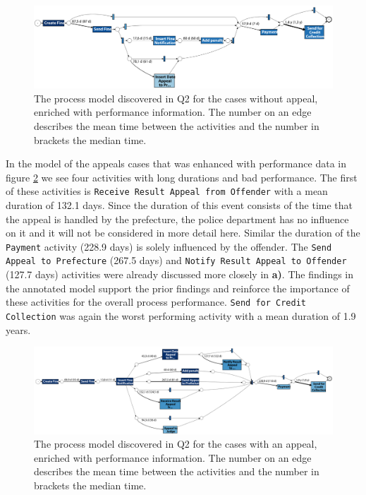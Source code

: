\documentclass[12pt]{report}
\begin{document}
\begin{figure}[H]
  \centering
  \includegraphics[width=\textwidth]{figures/no_appeals_performance_prom.png}
  \caption{The process model discovered in Q2 for the cases without appeal, enriched with performance information. The number on an edge describes the mean time between the activities and the number in brackets the median time.}
  \label{fig:no_appeals_performance_prom}
\end{figure}
In the model of the appeals cases that was enhanced with performance data in figure \ref{fig:appeals_performance_prom} we see four activities with long durations and bad performance. The first of these activities is \texttt{Receive Result Appeal from Offender} with a mean duration of 132.1 days. Since the duration of this event consists of the time that the appeal is handled by the prefecture, the police department has no influence on it and it will not be considered in more detail here. Similar the duration of the \texttt{Payment} activity (228.9 days) is solely influenced by the offender. The \texttt{Send Appeal to Prefecture} (267.5 days) and \texttt{Notify Result Appeal to Offender} (127.7 days) activities were already discussed more closely in \textbf{a)}. The findings in the annotated model support the prior findings and reinforce the importance of these activities for the overall process performance. \texttt{Send for Credit Collection} was again the worst performing activity with a mean duration of 1.9 years.
\begin{figure}[H]
  \centering
  \includegraphics[width=\textwidth]{figures/appeals_performance_prom.png}
  \caption{The process model discovered in Q2 for the cases with an appeal, enriched with performance information. The number on an edge describes the mean time between the activities and the number in brackets the median time.}
  \label{fig:appeals_performance_prom}
\end{figure}
\end{document}
